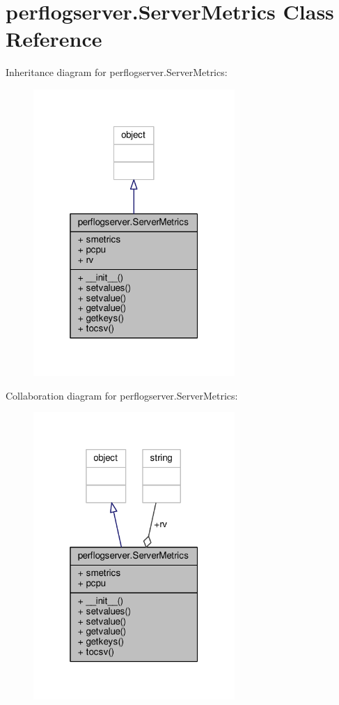 \hypertarget{classperflogserver_1_1_server_metrics}{\section{perflogserver.\+Server\+Metrics Class Reference}
\label{classperflogserver_1_1_server_metrics}
}


Inheritance diagram for perflogserver.\+Server\+Metrics\+:
\nopagebreak
\begin{figure}[H]
\begin{center}
\leavevmode
\includegraphics[width=217pt]{classperflogserver_1_1_server_metrics__inherit__graph}
\end{center}
\end{figure}


Collaboration diagram for perflogserver.\+Server\+Metrics\+:
\nopagebreak
\begin{figure}[H]
\begin{center}
\leavevmode
\includegraphics[width=217pt]{classperflogserver_1_1_server_metrics__coll__graph}
\end{center}
\end{figure}
